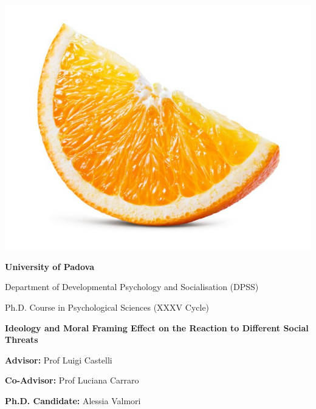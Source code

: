 \documentclass[
]{article}
\author{}
\date{\vspace{-2.5em}}
\begin{document}

	\begin{center}
		\includegraphics[width=0.25\linewidth]{img/Logo.jpg}
	\end{center}
	
	\begin{center}
		\begin{Large}
			\textbf{University of Padova}
			
			Department of Developmental Psychology and Socialisation (DPSS)
		\end{Large}
		
	\end{center}
	
	\vspace{3mm}
	\begin{center}
		\begin{large}
			Ph.D. Course in Psychological Sciences (XXXV Cycle)
		\end{large}
		
		\begin{huge}
			\bfseries
			Ideology and Moral Framing Effect on the Reaction to Different Social Threats
		\end{huge}
		
		
	\end{center}
	
	\vspace{2cm}
	\begin{multicols}{2}
		\begin{flushleft}
				\textbf{Advisor:} Prof Luigi Castelli
				
				\textbf{Co-Advisor:} Prof Luciana Carraro
			
		\end{flushleft}
		\columnbreak
		\begin{flushright}
			\vspace{1.5cm}
			
				\textbf{Ph.D. Candidate:} Alessia Valmori 
			
		\end{flushright}
		
	\end{multicols}
\end{document}

